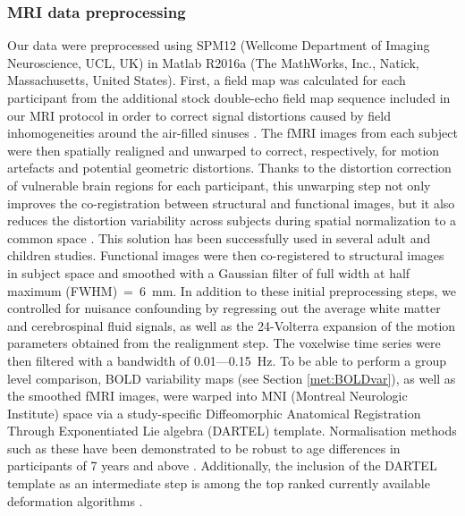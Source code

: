\subsubsection{MRI data preprocessing}
Our data were preprocessed using SPM12 (Wellcome Department of Imaging Neuroscience, UCL, UK) in Matlab R2016a (The MathWorks, Inc., Natick, Massachusetts, United States). First, a field map was calculated for each participant from the additional stock double-echo field map sequence included in our MRI protocol \citep{Jezzard1995, Hutton2002} in order to correct signal distortions caused by field inhomogeneities around the air-filled sinuses \citep{Gorno-Tempini2002}. The fMRI images from each subject were then spatially realigned and unwarped to correct, respectively, for motion artefacts and potential geometric distortions. Thanks to the distortion correction of vulnerable brain regions for each participant, this unwarping step not only improves the co-registration between structural and functional images, but it also reduces the distortion variability across subjects during spatial normalization to a common space \citep{Hutton2002, Togo2017}.  This solution has been successfully used in several adult  \citep{Togo2017} and children \citep{Wozniak2011} studies.
Functional images were then co-registered to structural images in subject space and smoothed with a Gaussian filter of full width at half maximum (FWHM)~=~6~mm. 
In addition to these initial preprocessing steps, we controlled for nuisance confounding by regressing out the average white matter and cerebrospinal fluid signals, as well as the 24-Volterra expansion of the motion parameters obtained from the realignment step. The voxelwise time series were then filtered with a bandwidth of 0.01---0.15~Hz.
To be able to perform a group level comparison, BOLD variability maps (see Section \ref{met:BOLDvar}), as well as the smoothed fMRI images, were warped into MNI (Montreal Neurologic Institute) space via a study-specific Diffeomorphic Anatomical Registration Through Exponentiated Lie algebra (DARTEL) template. Normalisation methods such as these have been demonstrated to be robust to age differences in participants of 7 years and above \citep{ASHBURNER1998, Burgund2002}. Additionally, the inclusion of the DARTEL template as an intermediate step is among the top ranked currently available deformation algorithms \citep{Klein2009}.

